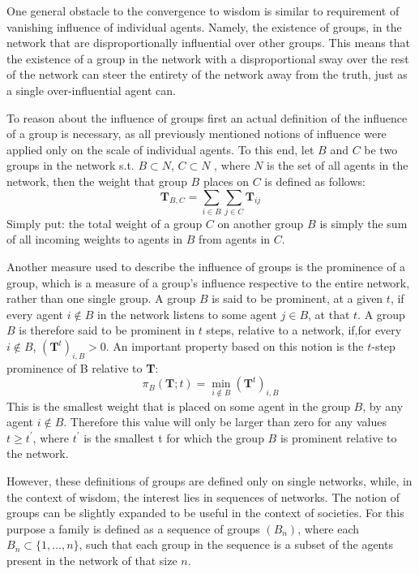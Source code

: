 \documentclass{article}
\newcommand{\Tij}{\textbf{T}_{ij}}
\begin{document}
One general obstacle to the convergence to wisdom is similar to requirement of vanishing influence of individual agents. Namely, the existence of groups, in the network that are disproportionally influential over other groups.
This means that the existence of a group in the network with a disproportional sway over the rest of the network can steer the entirety of the network away from the truth, just as a single over-influential agent can.

To reason about the influence of groups first an actual definition of the influence of a group is necessary, as all previously mentioned notions of influence were applied only on the scale of individual agents. To this end, let $B$ and $C$ be two groups in the network s.t. $B \subset N$, $C \subset N$ , where $N$ is the set of all agents in the network, then the weight that group $B$ places on $C$ is defined as follows:
\begin{equation}
    \textbf{T}_{B, C} = \sum_{i\in B}\sum_{j \in C} \Tij
\end{equation}
Simply put: the total weight of a group $C$ on another group $B$ is simply the sum of all incoming weights to agents in $B$ from agents in $C$.

Another measure used to describe the influence of groups is the prominence of a group, which is a measure of a group's influence respective to the entire network, rather than one single group.
A group $B$ is said to be prominent, at a given $t$, if every agent $i \notin B$ in the network listens to some agent $j\in B$, at that $t$.
A group $B$ is therefore said to be prominent in $t$ steps, relative to a network, if,for every $i \notin B$, $(\textbf{T}^{t})_{i,B} > 0$. An important property based on this notion is the $t$-step prominence of B relative to \textbf{T}: 
\begin{equation}
    \pi_B(\textbf{T}; t) = \min_{i\notin B} (\textbf{T}^{t})_{i,B}
\end{equation}
This is the smallest weight that is placed on some agent in the group $B$, by any agent $i\notin B$. Therefore this value will only be larger than zero for any values $t \geq t^{\prime}$, where $t^{\prime}$ is the smallest t for which
the group $B$ is prominent relative to the network.
\newline

However, these definitions of groups are defined only on single networks, while, in the context of wisdom, the interest lies in sequences of networks. The notion of groups can be slightly expanded to be useful in the context of societies. For this purpose a family is defined as a sequence of groups $(B_n)$, where each $B_n \subset \{1, ..., n\}$, such that each group in the sequence is a subset of the agents present in the network of that size $n$.
\end{document}
